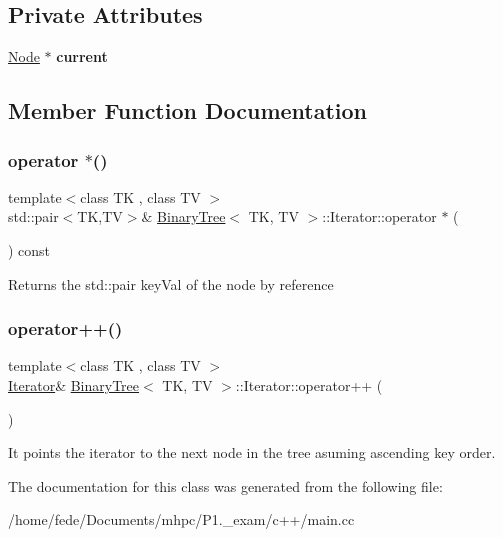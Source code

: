 \subsection*{Private Attributes}
\begin{DoxyCompactItemize}
\item 
\mbox{\label{classBinaryTree_1_1Iterator_ac2829913ed57872cd994fe1eea8fa99f}} 
\mbox{\hyperlink{structBinaryTree_1_1Node}{Node}} $\ast$ {\bfseries current}
\end{DoxyCompactItemize}


\subsection{Member Function Documentation}
\mbox{\label{classBinaryTree_1_1Iterator_a60fc231c2695c4d6095ea4c384b218b0}} 
\subsubsection{\texorpdfstring{operator $\ast$()}{operator *()}}
{\footnotesize\ttfamily template$<$class TK , class TV $>$ \\
std\+::pair$<$TK,TV$>$\& \mbox{\hyperlink{classBinaryTree}{Binary\+Tree}}$<$ TK, TV $>$\+::Iterator\+::operator $\ast$ (\begin{DoxyParamCaption}{ }\end{DoxyParamCaption}) const\hspace{0.3cm}{\ttfamily [inline]}}

Returns the std\+::pair key\+Val of the node by reference \mbox{\label{classBinaryTree_1_1Iterator_a6757f54b0ba8eda2f3040ba6b0facfdb}} 
\subsubsection{\texorpdfstring{operator++()}{operator++()}}
{\footnotesize\ttfamily template$<$class TK , class TV $>$ \\
\mbox{\hyperlink{classBinaryTree_1_1Iterator}{Iterator}}\& \mbox{\hyperlink{classBinaryTree}{Binary\+Tree}}$<$ TK, TV $>$\+::Iterator\+::operator++ (\begin{DoxyParamCaption}{ }\end{DoxyParamCaption})\hspace{0.3cm}{\ttfamily [inline]}}

It points the iterator to the next node in the tree asuming ascending key order. 

The documentation for this class was generated from the following file\+:\begin{DoxyCompactItemize}
\item 
/home/fede/\+Documents/mhpc/\+P1.\+\_\+exam/c++/main.\+cc\end{DoxyCompactItemize}
